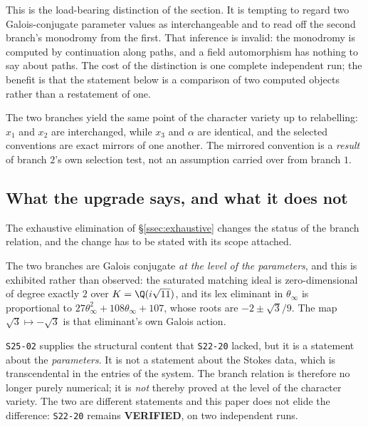 This is the load-bearing distinction of the section. It is tempting to regard
two Galois-conjugate parameter values as interchangeable and to read off the
second branch's monodromy from the first. That inference is invalid: the
monodromy is computed by continuation along paths, and a field automorphism has
nothing to say about paths. The cost of the distinction is one complete
independent run; the benefit is that the statement below is a comparison of two
computed objects rather than a restatement of one.

\begin{remark}
The two branches yield the same point of the character variety up to
relabelling: $x_1$ and $x_2$ are interchanged, while $x_3$ and $\alpha$ are
identical, and the selected conventions are exact mirrors of one another. The
mirrored convention is a \emph{result} of branch $2$'s own selection test, not
an assumption carried over from branch $1$.
\end{remark}

\subsection{What the upgrade says, and what it does
not}\label{ssec:upgrade-scope}

The exhaustive elimination of \S\ref{ssec:exhaustive} changes the status of the
branch relation, and the change has to be stated with its scope attached.

\begin{remark}
The two branches are Galois conjugate \emph{at the level of the parameters},
and this is exhibited rather than observed: the saturated matching ideal is
zero-dimensional of degree exactly $2$ over $K=\Q(i\sqrt{11})$, and its lex
eliminant in $\theta_\infty$ is proportional to
$27\theta_\infty^2+108\theta_\infty+107$, whose roots are $-2\pm\sqrt3/9$. The
map $\sqrt3\mapsto-\sqrt3$ is that eliminant's own Galois action.
\end{remark}

\begin{remark}
\texttt{S25-02} supplies the structural content that \texttt{S22-20} lacked,
but it is a statement about the \emph{parameters}. It is not a statement about
the Stokes data, which is transcendental in the entries of the system. The
branch relation is therefore no longer purely numerical; it is \emph{not}
thereby proved at the level of the character variety. The two are different
statements and this paper does not elide the difference: \texttt{S22-20}
remains \textbf{VERIFIED}, on two independent runs.
\end{remark}

